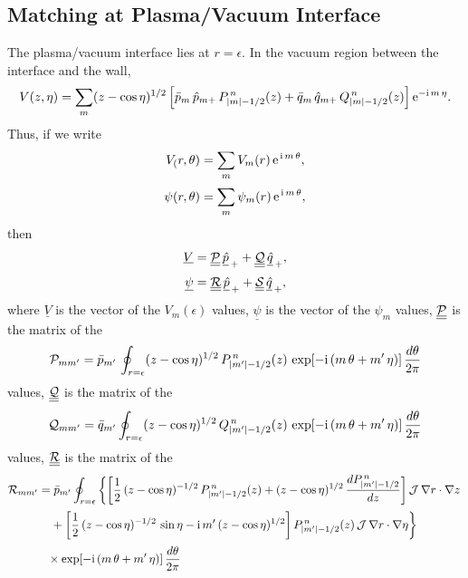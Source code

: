 \documentclass[12pt,prb,aps,notitlepage]{revtex4-1}
\begin{document}
\subsection{Matching at Plasma/Vacuum Interface}
The plasma/vacuum interface lies at $r=\epsilon$. In the vacuum region between the interface and the wall, 
\begin{equation}
V(z,\eta) =\sum_m (z-\cos\eta)^{1/2}\left[\bar{p}_{m}\,\hat{p}_{m+}\,P_{|m|-1/2}^{\,n}(z)+\bar{q}_m\,\hat{q}_{m+}\,Q_{|m|-1/2}^{\,n}(z)\right]{\rm e}^{-{\rm i}\,m\,\eta}. 
\end{equation}
Thus, if we write
\begin{align}\label{e90}
V_(r,\theta) &= \sum_m V_m(r)\,{\rm e}^{\,{\rm i}\,m\,\theta},\\[0.5ex]
\psi(r,\theta) & = \sum_m \psi_m(r)\,{\rm e}^{\,{\rm i}\,m\,\theta},\label{e91}
\end{align}
then
\begin{align}
\underline{V}&= \underline{\underline{{\cal P}}}\,\underline{\hat{p}}_{\,+}+ \underline{\underline{{\cal Q}}}\,\underline{\hat{q}}_{\,+},\\[0.5ex]
\underline{\psi}&= \underline{\underline{{\cal R}}}\,\underline{\hat{p}}_{\,+}+ \underline{\underline{{\cal S}}}\,\underline{\hat{q}}_{\,+},
\end{align}
where $\underline{V}$ is the vector of the $V_m(\epsilon)$ values, $\underline{\psi}$ is the vector of the $\psi_m$ values, $\underline{\underline{{\cal P}}}$ is the
matrix of the
\begin{equation}
{\cal P}_{mm'}=\bar{p}_{m'}\,\oint_{r=\epsilon}(z-\cos\eta)^{1/2}\,P_{|m'|-1/2}^{\,n}(z)\,\exp[-{\rm i}\,(m\,\theta+m'\,\eta)]\,\frac{d\theta}{2\pi}
\end{equation}
values, 
$\underline{\underline{{\cal Q}}}$ is the
matrix of the
\begin{equation}
{\cal Q}_{mm'}=\bar{q}_{m'}\oint_{r=\epsilon}(z-\cos\eta)^{1/2}\,Q_{|m'|-1/2}^{\,n}(z)\,\exp[-{\rm i}\,(m\,\theta+m'\,\eta)]\,\frac{d\theta}{2\pi}
\end{equation}
values, $\underline{\underline{{\cal R}}}$ is the matrix of the 
\begin{align}\label{e354}
{\cal R}_{mm'} &=\bar{p}_{m'}\oint_{r=\epsilon}
\left\{\left[\frac{1}{2}\,(z-\cos\eta)^{-1/2}\,P_{|m'|-1/2}^{\,n}(z)+(z-\cos\eta)^{1/2}\,\frac{dP_{|m'|-1/2}^{\,n}}{dz}\right]{\cal J}\,\nabla r\cdot \nabla z
\right.\nonumber\\[0.5ex]&
\left.\phantom{=}+\left[\frac{1}{2}\,(z-\cos\eta)^{-1/2}\,\sin\eta-{\rm i}\,m'\,(z-\cos\eta)^{1/2}\right]P_{|m'|-1/2}^{\,n}(z)\,{\cal J}\,\nabla r\cdot \nabla \eta
\right\}\nonumber\\[0.5ex] &
\phantom{=}\times\exp[-{\rm i}\,(m\,\theta+m'\,\eta)]\,\frac{d\theta}{2\pi}
\end{align}
\end{document}
